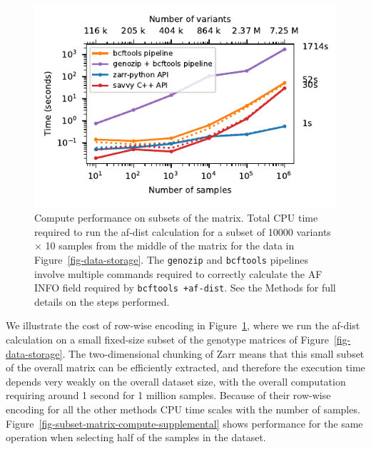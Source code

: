 \documentclass[a4paper,num-refs]{oup-contemporary}
\begin{document}
\begin{figure}
\includegraphics{figures/subset-matrix-compute}
\caption{Compute performance on subsets of the matrix.
Total CPU time required to run the af-dist calculation for
a subset of 10000 variants $\times$ 10 samples from the middle of the matrix
for the data in Figure~\ref{fig-data-storage}.
The \texttt{genozip} and \texttt{bcftools} pipelines involve
multiple commands required to correctly calculate the AF INFO field
required by \texttt{bcftools +af-dist}. See the Methods for full details
on the steps performed.
\label{fig-subset-matrix-compute}}
\end{figure}

We illustrate the cost of row-wise encoding in
Figure~\ref{fig-subset-matrix-compute}, where we run the af-dist calculation
on a small fixed-size subset of the genotype matrices of
Figure~\ref{fig-data-storage}. The two-dimensional chunking of Zarr
means that this small subset of the overall matrix can be efficiently
extracted, and therefore the execution time depends very weakly on 
the overall dataset size, with the overall computation requiring around
1 second for 1 million samples. Because of their 
row-wise encoding for all the other methods CPU time
scales with the number of samples.
Figure~\ref{fig-subset-matrix-compute-supplemental} shows performance
for the same operation when selecting half of the samples in the 
dataset.
\end{document}
